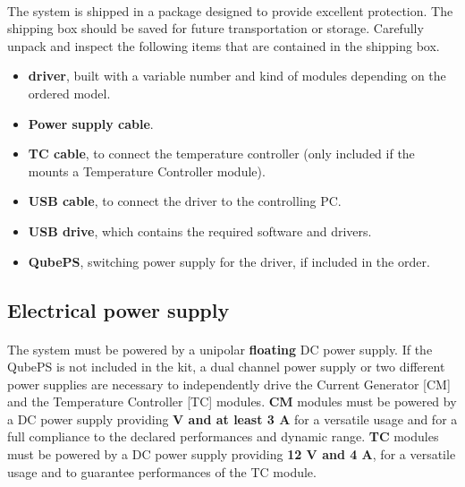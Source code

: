\paragraph{}The \QubeModel  system is shipped in a package designed to provide excellent protection. The shipping box should be saved for future transportation or storage. Carefully unpack and inspect the following items that are contained in the shipping box.
\begin{itemize}
    \itemsep0em 
    \item \textbf{\QubeModel  driver}, built with a variable number and kind of modules depending on the ordered model.
    \item \textbf{Power supply cable}.
    \item \textbf{TC cable}, to connect the temperature controller (only included if the \QubeModel  mounts a Temperature Controller module).
    \item \textbf{USB cable}, to connect the \QubeModel  driver to the controlling PC.
    \item \textbf{USB drive}, which contains the required software and drivers.
    \item \textbf{QubePS}, switching power supply for the \QubeModel  driver, if included in the order.
\end{itemize}





\subsection{Electrical power supply}    \label{cpt:Power_suppl}
\paragraph{}The \QubeModel  system must be powered by a unipolar \textbf{floating} DC power supply. If the QubePS is not included in the \QubeModel  kit, a dual channel power supply or two different power supplies are necessary to independently drive the Current Generator [CM] and the Temperature Controller [TC] modules. \newline
\textbf{CM} modules must be powered by a DC power supply providing \textbf{\QubeSupplyVoltage V and at least 3 A} for a versatile usage and for a full compliance to the declared performances and dynamic range. 
\textbf{TC} modules must be powered by a DC power supply providing \textbf{12 V and 4 A}, for a versatile usage and to guarantee performances of the TC module.


